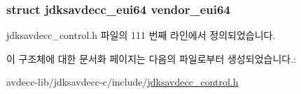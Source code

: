 \subsubsection[{\texorpdfstring{vendor\+\_\+eui64}{vendor_eui64}}]{\setlength{\rightskip}{0pt plus 5cm}struct {\bf jdksavdecc\+\_\+eui64} vendor\+\_\+eui64}\hypertarget{structjdksavdecc__control__vendor__blob_a6183c85748a8af0003d293d653c4ae9b}{}\label{structjdksavdecc__control__vendor__blob_a6183c85748a8af0003d293d653c4ae9b}


jdksavdecc\+\_\+control.\+h 파일의 111 번째 라인에서 정의되었습니다.



이 구조체에 대한 문서화 페이지는 다음의 파일로부터 생성되었습니다.\+:\begin{DoxyCompactItemize}
\item 
avdecc-\/lib/jdksavdecc-\/c/include/\hyperlink{jdksavdecc__control_8h}{jdksavdecc\+\_\+control.\+h}\end{DoxyCompactItemize}
